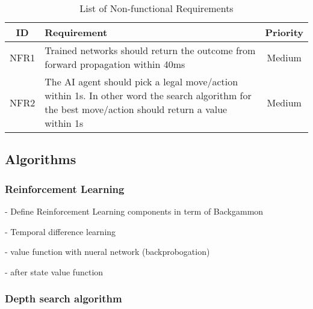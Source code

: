 \documentclass[12pt,a4paper]{article}
\begin{document}
\begin{table}[htb]
    \centering
    \caption{List of Non-functional Requirements}
    \vspace*{6pt}
    \label{req}
    \begin{tabular}{cp{12cm}c}
        \hline
        \hline
        ID & Requirement & Priority \\ 
        \hline
        NFR1 & Trained networks should return the outcome from forward propagation within 40ms & Medium \\
        \hline
        NFR2 & The AI agent should pick a legal move/action within 1s. In other word the search algorithm for the best move/action should return a value within 1s & Medium \\
        \hline
    \end{tabular}
\end{table}
\subsection{Algorithms}
\subsubsection{Reinforcement Learning}
- Define Reinforcement Learning components in term of Backgammon

- Temporal difference learning

- value function with nueral network (backprobogation)

- after state value function

\subsubsection{Depth search algorithm}
\end{document}
